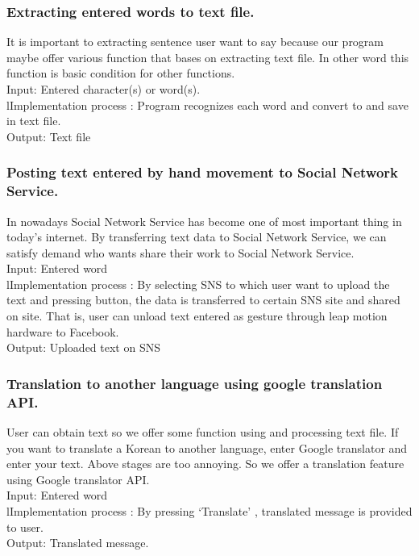 \documentclass[10pt,journal,compsoc]{IEEEtran}
\begin{document}
\subsubsection{Extracting entered words to text file.}

It is important to extracting sentence user want to say because our program maybe offer various function that bases on extracting text file. In other word this function is basic condition for other functions.
\\Input: Entered character(s) or word(s).
\\lImplementation process : Program recognizes each word and convert to and save in text file.
\\Output: Text file

\subsubsection{ Posting text entered by hand movement to Social Network Service.}

In nowadays Social Network Service has become one of most important thing in today’s internet. By transferring text data to Social Network Service, we can satisfy demand who wants share their work to Social Network Service.
\\Input: Entered word
\\lImplementation process :  By selecting SNS  to which user want to upload the text and pressing button, the data is transferred to certain SNS site and shared on site. That is, user can unload text entered as gesture through leap motion hardware to Facebook.
\\Output: Uploaded text on SNS

\subsubsection{ Translation to another language using google translation API.}

User can obtain text so we offer some function using and processing text file. If you want to translate a Korean to another language, enter Google translator and enter your text. Above stages are too annoying. So we offer a translation feature using Google translator API.
\\Input: Entered word
\\lImplementation process :  By pressing ‘Translate’ , translated message is provided to user.
\\Output: Translated message.
\end{document}
